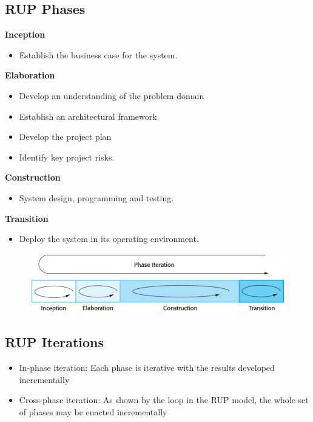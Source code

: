\documentclass{report}
\begin{document}
\subsection{RUP Phases}
\vspace{-1em}
\begin{multicols}{2}
\noindent \textbf{Inception}
\begin{itemize}
  \item Establish the business case for the system.
\end{itemize}
\textbf{Elaboration}
\begin{itemize}
  \item Develop an understanding of the problem domain
  \item Establish an architectural framework
  \item Develop the project plan
  \item Identify key project risks.
\end{itemize}
\textbf{Construction}
\begin{itemize}
  \item System design, programming and testing.
\end{itemize}
\textbf{Transition}
\begin{itemize}
  \item Deploy the system in its operating environment.
\end{itemize}
\columnbreak
\begin{figure}[H]
\centering
\includegraphics[scale=.35,trim=1cm 1cm 1cm 1cm]{assets/CEN4010_RUP_Phases.jpg}
\end{figure}

\subsection{RUP Iterations}
\begin{itemize}
  \item In-phase iteration: Each phase is iterative with the results developed incrementally
  \item Cross-phase iteration: As shown by the loop in the RUP model, the whole set of phases may be enacted incrementally
\end{itemize}
\end{multicols}
\end{document}
